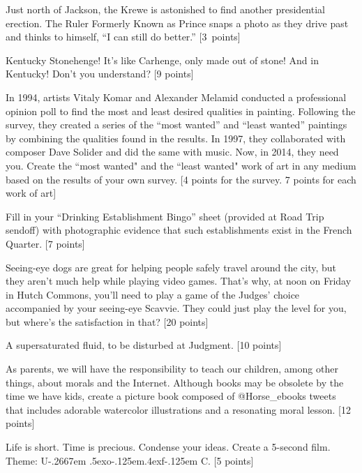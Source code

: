 \documentclass{book}
\def\UofC{U\kern-.2667em \lower.5ex\hbox{o}\kern-.125em\raise.4ex\hbox{f}\kern-.125em C}
\begin{document}
\begin{list}{}{}
\item Just north of Jackson, the Krewe is astonished to find another presidential erection. The Ruler Formerly Known as Prince snaps a photo as they drive past and thinks to himself, ``I can still do better.'' [3~points]

\item Kentucky Stonehenge! It's like Carhenge, only made out of stone! And in Kentucky! Don't you understand? [9 points] 

\item In 1994, artists Vitaly Komar and Alexander Melamid conducted a professional opinion poll to find the most and least desired qualities in painting. Following the survey, they created a series of the ``most wanted'' and ``least wanted'' paintings by combining the qualities found in the results. In 1997, they collaborated with composer Dave Solider and did the same with music. Now, in 2014, they need you. Create the ``most wanted" and the ``least wanted" work of art in any medium based on the results of your own survey. [4 points for the survey. 7 points for each work of art] 

\item Fill in your ``Drinking Establishment Bingo'' sheet (provided at Road Trip sendoff) with photographic evidence that such establishments exist in the French Quarter. [7 points] 

\item Seeing-eye dogs are great for helping people safely travel around the city, but they aren't much help while playing video games. That's why, at noon on Friday in Hutch Commons, you'll need to play a game of the Judges' choice accompanied by your seeing-eye Scavvie. They could just play the level for you, but where's the satisfaction in that? [20 points]

\item A supersaturated fluid, to be disturbed at Judgment. [10 points]

\item As parents, we will have the responsibility to teach our children, among other things, about morals and the Internet. Although books may be obsolete by the time we have kids, create a picture book composed of @Horse\_ebooks tweets that includes adorable watercolor illustrations and a resonating moral lesson. [12 points]

\item Life is short. Time is precious. Condense your ideas. Create a 5-second film. Theme: \UofC. [5 points] 


\end{list}
\end{document}
